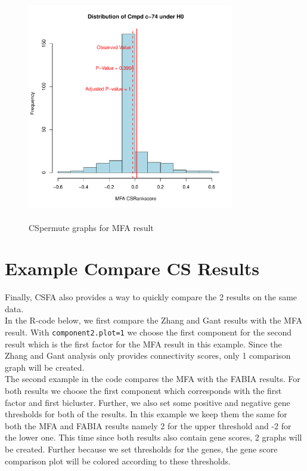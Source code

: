 \documentclass[a4paper]{article}\usepackage[]{graphicx}\usepackage[]{color}
\newenvironment{knitrout}{}{} %
\begin{document}
\begin{knitrout}
\begin{figure}[H]
\includegraphics[width=9cm,height=10cm]{figure/CSpermuteplots2-3} \hfill{}

\caption[CSpermute graphs for MFA result]{CSpermute graphs for MFA result}\label{fig:CSpermuteplots2}
\end{figure}


\end{knitrout}

\section{Example Compare CS Results}
Finally, CSFA also provides a way to quickly compare the 2 results on the same
data.\\
In the R-code below, we first compare the Zhang and Gant results with the MFA
result. With \texttt{component2.plot=1} we choose the first component for the
second result which is the first factor for the MFA result in this example.
Since the Zhang and Gant analysis only provides connectivity scores, only 1
comparison graph will be created.\\
The second example in the code compares the MFA with the FABIA results. For both
results we choose the first component which corresponds with the first factor
and first bicluster. Further, we also set some positive and negative gene
thresholds for both of the results. In this example we keep them the same for
both the MFA and FABIA results namely 2 for the upper threshold and -2 for the
lower one. This time since both results also contain gene scores, 2 graphs will
be created. Further because we set thresholds for the genes, the gene score
comparison plot will be colored according to these thresholds.
\end{document}
